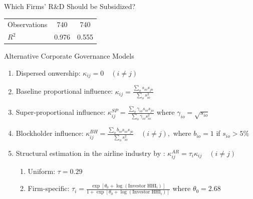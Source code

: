 \documentclass[
  10pt,
  aspectratio=169,   %
]{beamer}
\theoremstyle{plain}
\begin{document}
\begin{frame}{Which Firms' R\&D Should be Subsidized?}
\begin{center}
\begin{tabular}{lcc}
      \hline
      Observations                    & \multicolumn{1}{c}{740}                                            & \multicolumn{1}{c}{740}                                                                     \\
      $R^2$                           & \multicolumn{1}{c}{0.976}                                          & \multicolumn{1}{c}{0.555}                                                                   \\
      \hline\hline
    \end{tabular}
  \end{center}
\end{frame}


\begin{frame}{Alternative Corporate Governance Models}
  \label{corporate_governance}
  \begin{enumerate}
    \item Dispersed onwership: $\kappa_{ij}=0 \quad(i\neq j)$
    \medskip{}
    \item Baseline proportional influence: $\kappa_{ij}=\frac{\sum_{o} s_{io}s_{jo}}{\sum_{o}s_{io}^2}$ \medskip{}
    \item Super-proportional influence: $\kappa^{SP}_{ij}=\frac{\sum_{o}\gamma_{io}s_{io}s_{jo}}{\sum_{o}\gamma_{io}s_{io}^2}$ where $\gamma_{io}=\sqrt{s_{io}}$
          \medskip{}\pause
    \item Blockholder influence: $\kappa^{BH}_{ij}=\frac{\sum_{o}b_{io}s_{io}s_{jo}}{\sum_{o}s_{io}^2}\quad(i\neq j),$ where $b_{io}=1$ if $s_{io}>5\%$
          \medskip{}\pause
    \item Structural estimation in the airline industry by \citet{Azar2021-mb}: $\kappa^{AR}_{ij} = \tau_{i}\kappa_{ij}\quad(i\neq j)$ 
    \begin{enumerate}
      \item Uniform: $\tau = 0.29$
      \item Firm-specific: $\tau_{i}=\frac{\exp\left[\theta_{0}+\log\left(\text{Investor HHI}_{i}\right)\right]}{1+\exp\left[\theta_{0}+\log\left(\text{Investor HHI}_{i}\right)\right]}$ where $\theta_{0}=2.68$
    \end{enumerate}
  \end{enumerate}
\end{frame}
\end{document}
